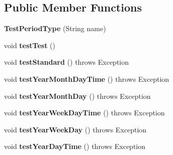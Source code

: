 \subsection*{Public Member Functions}
\begin{DoxyCompactItemize}
\item 
\hypertarget{classorg_1_1joda_1_1time_1_1_test_period_type_addb14b04c069b3d2fced2f950f9002b5}{{\bfseries Test\-Period\-Type} (String name)}\label{classorg_1_1joda_1_1time_1_1_test_period_type_addb14b04c069b3d2fced2f950f9002b5}

\item 
\hypertarget{classorg_1_1joda_1_1time_1_1_test_period_type_a0a2afae7100636529c35145e2a872bad}{void {\bfseries test\-Test} ()}\label{classorg_1_1joda_1_1time_1_1_test_period_type_a0a2afae7100636529c35145e2a872bad}

\item 
\hypertarget{classorg_1_1joda_1_1time_1_1_test_period_type_a20f77de52f410512f4ba2a2a6829a9f0}{void {\bfseries test\-Standard} ()  throws Exception }\label{classorg_1_1joda_1_1time_1_1_test_period_type_a20f77de52f410512f4ba2a2a6829a9f0}

\item 
\hypertarget{classorg_1_1joda_1_1time_1_1_test_period_type_a933bf75d0d1b4569edfca32c7e8dab18}{void {\bfseries test\-Year\-Month\-Day\-Time} ()  throws Exception }\label{classorg_1_1joda_1_1time_1_1_test_period_type_a933bf75d0d1b4569edfca32c7e8dab18}

\item 
\hypertarget{classorg_1_1joda_1_1time_1_1_test_period_type_a9be4ed225fab46408db5f2b6c1de8df6}{void {\bfseries test\-Year\-Month\-Day} ()  throws Exception }\label{classorg_1_1joda_1_1time_1_1_test_period_type_a9be4ed225fab46408db5f2b6c1de8df6}

\item 
\hypertarget{classorg_1_1joda_1_1time_1_1_test_period_type_af1681fd86899620e44a359134a39b9b0}{void {\bfseries test\-Year\-Week\-Day\-Time} ()  throws Exception }\label{classorg_1_1joda_1_1time_1_1_test_period_type_af1681fd86899620e44a359134a39b9b0}

\item 
\hypertarget{classorg_1_1joda_1_1time_1_1_test_period_type_ac046aacb4a99983246038552e479e2e7}{void {\bfseries test\-Year\-Week\-Day} ()  throws Exception }\label{classorg_1_1joda_1_1time_1_1_test_period_type_ac046aacb4a99983246038552e479e2e7}

\item 
\hypertarget{classorg_1_1joda_1_1time_1_1_test_period_type_a54db3d2ec9e150aa18d012c39a04ff83}{void {\bfseries test\-Year\-Day\-Time} ()  throws Exception }\label{classorg_1_1joda_1_1time_1_1_test_period_type_a54db3d2ec9e150aa18d012c39a04ff83}


\end{DoxyCompactItemize}
